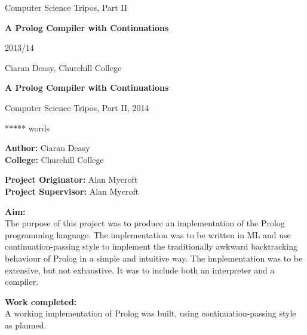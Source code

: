 \documentclass[12pt]{article}
\begin{document}
\thispagestyle{empty}

\medskip
{}
\medskip
{}

\vfil

\centerline{\large Computer Science Tripos, Part II}
\vspace{0.4in}
\centerline{\Large\bf A Prolog Compiler with Continuations}
\vspace{0.3in}
\centerline{\large 2013/14}
\vspace{2.5in}

\newpage
\hspace{5px}
\newpage

\vfil

\centerline{\large Ciaran Deasy, Churchill College}
\vspace{0.4in}
\centerline{\Large\bf A Prolog Compiler with Continuations}
\vspace{0.3in}
\centerline{\large Computer Science Tripos, Part II, 2014}
\vspace{0.1in}
\centerline{ ***** words}
\vspace{0.25in}

{\bf Author:} Ciaran Deasy\\
{\bf College:} Churchill College

\vspace{0.25in}

{\bf Project Originator:} Alan Mycroft\\
{\bf Project Supervisor:} Alan Mycroft

\vspace{0.25in}

{\bf Aim:}\\
The purpose of this project was to produce an implementation of the Prolog programming language. The implementation was to be written in ML and use continuation-passing style to implement the traditionally awkward backtracking behaviour of Prolog in a simple and intuitive way. The implementation was to be extensive, but not exhaustive. It was to include both an interpreter and a compiler. %

\vspace{0.25in}

{\bf Work completed:}\\
A working implementation of Prolog was built, using continuation-passing style as planned. %

\vspace{0.25in}
\end{document}
